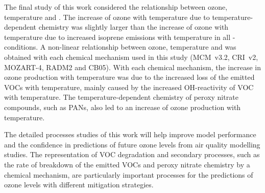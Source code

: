 The final study of this work considered the relationship between ozone, temperature and .
The increase of ozone with temperature due to temperature-dependent chemistry was slightly larger than the increase of ozone with temperature due to increased isoprene emissions with temperature in all -conditions.
A non-linear relationship between ozone, temperature and  was obtained with each chemical mechanism used in this study (MCM~v3.2, CRI~v2, MOZART-4, RADM2 and CB05).
With each chemical mechanism, the increase in ozone production with temperature was due to the increased loss of the emitted VOCs with temperature, mainly caused by the increased OH-reactivity of VOC with temperature.
The temperature-dependent chemistry of peroxy nitrate compounds, such as PANs, also led to an increase of ozone production with temperature.

The detailed processes studies of this work will help improve model performance and the confidence in predictions of future ozone levels from air quality modelling studies.
The representation of VOC degradation and secondary processes, such as the rate of breakdown of the emitted VOCs and peroxy nitrate chemistry by a chemical mechanism, are particularly important processes for the predictions of ozone levels with different mitigation strategies.

\newpage
